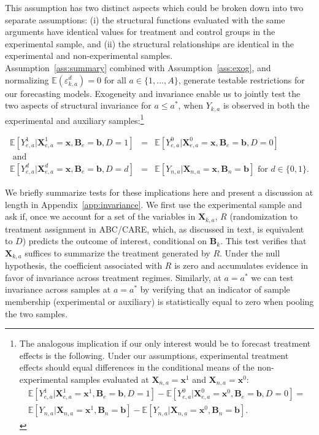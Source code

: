 \noindent This assumption has two distinct aspects which could be broken down into two separate assumptions: (i) the structural functions evaluated with the same arguments have identical values for treatment and control groups in the experimental sample, and (ii) the structural relationships are identical in the experimental and non-experimental samples.\\

\noindent Assumption~\ref{ass:summary} combined with Assumption~\ref{ass:exog}, and normalizing $\mathbb{E}(\varepsilon^d_{k,a})=0$ for all $a \in \{1,\dots,A\}$, generate testable restrictions for our forecasting models. Exogeneity and invariance enable us to jointly test the two aspects of structural invariance for $a \leq a^*$, when $Y_{k,a}$ is observed in both the experimental and auxiliary samples:\footnote{The analogous implication if our only interest would be to forecast treatment effects is the following. Under our assumptions, experimental treatment effects should equal differences in the conditional means of the non-experimental samples evaluated at $\bm{X}_{n,a} = \bm{x}^1$ and  $\bm{X}_{n,a} = \bm{x}^0$:
\begin{eqnarray}
\mathbb{E} \left[ Y_{e,a}^1 |  \bm{X}_{e,a}^1 = \bm{x}^1, \bm{B}_e = \bm{b}, D = 1 \right] - \mathbb{E} \left[ Y_{e,a}^0 |  \bm{X}_{e,a}^0 = \bm{x}^0, \bm{B}_e = \bm{b}, D = 0 \right] = \nonumber \\
\mathbb{E} \left[ Y_{n,a} | \bm{X}_{n,a} = \bm{x}^1, \bm{B}_n = \bm{b} \right] - \mathbb{E} \left[ Y_{n,a} | \bm{X}_{n,a} = \bm{x}^0, \bm{B}_n = \bm{b} \right].
\end{eqnarray}}

\begin{eqnarray}
\mathbb{E} \left[ Y_{e,a}^1 | \bm{X}_{e,a}^1 = \bm{x}, \bm{B}_{e} = \bm{b}, D = 1   \right] &=&  \mathbb{E} \left[ Y_{e,a}^0 | \bm{X}_{e,a}^0 = \bm{x}, \bm{B}_{e} = \bm{b}, D = 0   \right]  \\
\text{ and} & \nonumber \\
\mathbb{E} \left[ Y_{e,a}^d | \bm{X}_{e,a}^d = \bm{x}, \bm{B}_{e} = \bm{b}, D = d   \right] &=&  \mathbb{E} \left[ Y_{n,a} | \bm{X}_{n,a} = \bm{x}, \bm{B}_{n} = \bm{b} \right] \text{ for }  d \in \{0,1\}.
\end{eqnarray}

\noindent We briefly summarize tests for these implications here and present a discussion at length in Appendix~\ref{app:invariance}. We first use the experimental sample and ask if, once we account for a set of the variables in $\bm{X}_{k,a}$, $R$ (randomization to treatment assignment in ABC/CARE, which, as discussed in text, is equivalent to $D$) predicts the outcome of interest, conditional on $\bm{B}_k$. This test verifies that $\bm{X}_{k,a}$ suffices to summarize the treatment generated by $R$. Under the null hypothesis, the coefficient associated with $R$ is zero and accumulates evidence in favor of invariance across treatment regimes. Similarly, at $a = a^*$ we can test invariance across samples at $a = a^*$ by verifying that an indicator of sample membership (experimental or auxiliary) is statistically equal to zero when pooling the two samples.\\

